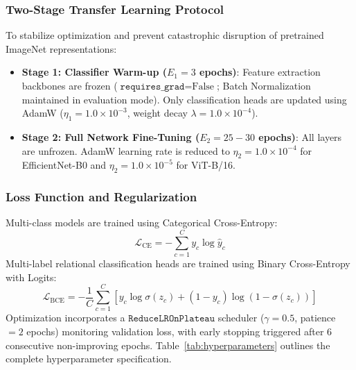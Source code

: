 \documentclass[journal]{IEEEtran}
\begin{document}
\subsubsection{Two-Stage Transfer Learning Protocol}
To stabilize optimization and prevent catastrophic disruption of pretrained ImageNet representations:
\begin{itemize}
    \item \textbf{Stage 1: Classifier Warm-up ($E_1 = 3$ epochs)}: Feature extraction backbones are frozen ($\texttt{requires\_grad} = \text{False}$; Batch Normalization maintained in evaluation mode). Only classification heads are updated using AdamW ($\eta_1 = 1.0 \times 10^{-3}$, weight decay $\lambda = 1.0 \times 10^{-4}$).
    \item \textbf{Stage 2: Full Network Fine-Tuning ($E_2 = 25 - 30$ epochs)}: All layers are unfrozen. AdamW learning rate is reduced to $\eta_2 = 1.0 \times 10^{-4}$ for EfficientNet-B0 and $\eta_2 = 1.0 \times 10^{-5}$ for ViT-B/16.
\end{itemize}

\subsubsection{Loss Function and Regularization}
Multi-class models are trained using Categorical Cross-Entropy:
\begin{equation}
\mathcal{L}_{\text{CE}} = -\sum_{c=1}^C y_c \log \hat{y}_c
\end{equation}
Multi-label relational classification heads are trained using Binary Cross-Entropy with Logits:
\begin{equation}
\mathcal{L}_{\text{BCE}} = -\frac{1}{C}\sum_{c=1}^C \left[ y_c \log \sigma(z_c) + (1 - y_c)\log(1 - \sigma(z_c)) \right]
\end{equation}
Optimization incorporates a $\texttt{ReduceLROnPlateau}$ scheduler ($\gamma = 0.5$, patience $= 2$ epochs) monitoring validation loss, with early stopping triggered after 6 consecutive non-improving epochs. Table~\ref{tab:hyperparameters} outlines the complete hyperparameter specification.
\end{document}
